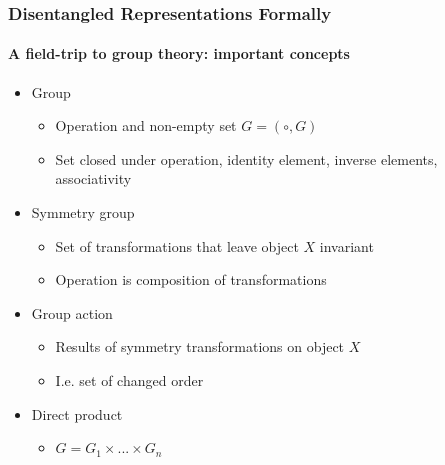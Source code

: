\documentclass[9pt]{beamer}
\begin{document}
\begin{frame}
\frametitle{Disentangled Representations Formally}
\framesubtitle{A field-trip to group theory: important concepts}
\begin{itemize}%
	\item Group
	\begin{itemize}
		\item Operation and non-empty set $G=(\circ, G)$
		\item Set closed under operation, identity element, inverse elements, associativity
	\end{itemize}
	\item Symmetry group
	\begin{itemize}
		\item Set of transformations that leave object $X$ invariant %
		\item Operation is composition of transformations
	\end{itemize}
	\item Group action
	\begin{itemize}
		\item Results of symmetry transformations on object $X$
		\item I.e. set of changed order %
	\end{itemize}
	\item Direct product
	\begin{itemize}
		\item $G = G_1 \times ... \times G_n$
	\end{itemize}
 \end{itemize}
\end{frame} 
\end{document}
